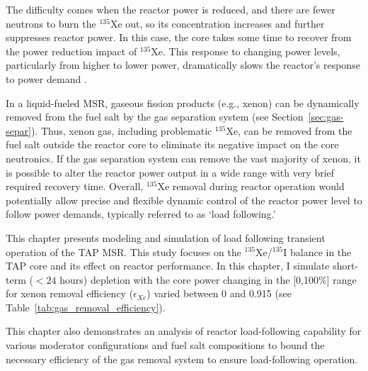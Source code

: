 The difficulty comes when the reactor power is reduced, and there are fewer 
neutrons to burn the $^{135}$Xe out, so its concentration increases and 
further suppresses reactor power. In this case, the core takes some time to 
recover from the power reduction impact of $^{135}$Xe. This response to 
changing power levels, particularly from higher to lower power, 
dramatically slows the reactor's response to power demand
\cite{lokhov_load-following_2011}. 

In a liquid-fueled \gls{MSR}, gaseous fission products (e.g., xenon) can be 
dynamically removed from the fuel salt by the gas separation system (see 
Section~\ref{sec:gas-separ}). Thus, xenon gas, including problematic 
$^{135}$Xe, can be removed from the fuel salt outside the reactor core to 
eliminate its negative impact on the core neutronics. If the gas separation 
system can remove the vast majority of xenon, it is possible to alter the 
reactor power output in a wide range with very brief required recovery time. 
Overall, $^{135}$Xe removal during reactor operation would potentially allow 
precise and flexible dynamic control of the reactor power level to follow 
power demands, typically referred to as `load following.'

This chapter presents modeling and simulation of load following transient 
operation of the \gls{TAP} \gls{MSR}. This study focuses on the 
$^{135}$Xe/$^{135}$I balance in the \gls{TAP} core and its effect on 
reactor performance. In this chapter, I simulate short-term ($<24$ hours) 
depletion with the core power changing in the [0,100\%] range for xenon 
removal efficiency ($\epsilon_{Xe}$) varied between 0 and 0.915 (see 
Table~\ref{tab:gas_removal_efficiency}). 

This chapter also demonstrates an analysis of reactor load-following 
capability for various moderator configurations and fuel salt compositions to 
bound the necessary efficiency of the gas removal system to ensure 
load-following operation. 

